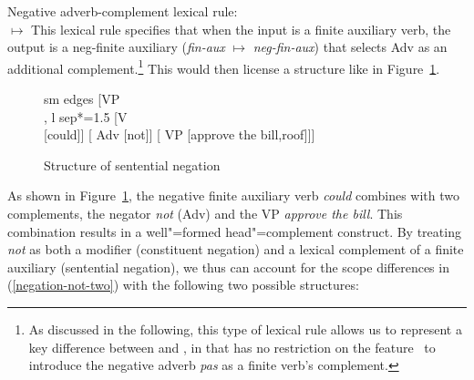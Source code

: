 \documentclass[output=paper
 	        ,biblatex
                ,babelshorthands
                ,newtxmath
                ,draftmode
                ,colorlinks, citecolor=brown
]{langscibook}
\begin{document}
\begin{exe}
\begin{xlist}
\begin{exe}
\begin{xlist}
\ea
Negative adverb-complement lexical rule:\\
 $\mapsto$
\z
{}
%
This lexical rule specifies that when the input is a finite auxiliary verb,
the output is a neg-finite auxiliary (\textit{fin-aux} $\mapsto$ \textit{neg-fin-aux})
that selects Adv as an additional complement.\footnote{As
discussed in the following, this type of lexical rule allows us
to represent a key difference between  and , in that
 has no restriction on the feature \AUX\ to introduce the negative
adverb {\it pas}
as a finite verb's complement.}  This would then
license a structure like in Figure~\ref{negation-fig:6}.


\begin{figure}
	\begin{forest}
		sm edges
		[VP\\
		, l sep*=1.5
			[V\\
				[could]]
			[ Adv
				[not]]
			[ VP
				[approve the bill,roof]]]
	\end{forest}
\caption{Structure of sentential negation}\label{negation-fig:6}
\end{figure}

As shown in Figure~\ref{negation-fig:6}, the negative finite auxiliary
verb \textit{could} combines with two complements, the negator
\textit{not} (Adv) and the VP \textit{approve the bill}.
This combination results in a well"=formed head"=complement construct.
By treating \textit{not} as both a modifier (constituent negation)
and a lexical complement of a finite auxiliary (sentential negation), we thus can
account for the scope differences in (\ref{negation-not-two}) with the
following two possible structures:


\end{xlist}
\end{exe}
\end{xlist}
\end{exe}
\end{document}
